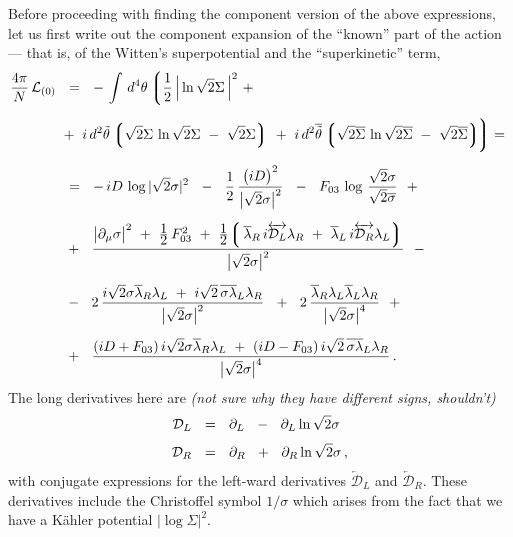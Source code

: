 \documentclass[epsfig,12pt]{article}
\newcommand{\cell}{{\mathcal L}}
\newcommand{\p}{\partial}
\newcommand{\ov}{\overline}
\newcommand{\md}{\mathcal{D}}
\newcommand{\lgr}{\left\lgroup}
\newcommand{\rgr}{\right\rgroup}
\begin{document}
	Before proceeding with finding the component version of the above expressions, let
	us first write out the component expansion of the ``known'' part of the action --- that is, 
	of the Witten's superpotential and the ``superkinetic'' term,
\begin{align}
%
\notag
	\frac{4\pi}{N}\, \cell_{(0)} &    ~~=~~
	-\, \int\, d^4\theta\, \bigg\lgroup \frac{1}{2}\, \Big| \ln \sqrt{2}\Sigma \, \Big|^2
			~+~ 
	\\[2mm]
%
\notag
	&
			~+~
			i\, d^2\tilde\theta 
			\lgr \sqrt{2}\Sigma\, \ln \sqrt{2}\Sigma  ~-~ \sqrt{2}\Sigma \rgr
			~+~
			i\, d^2\ov{\tilde\theta}
			\lgr \sqrt{2}\ov\Sigma\, \ln \sqrt{2}\ov\Sigma  ~-~ \sqrt{2}\ov\Sigma \rgr
			\!\!\bigg\rgroup
			=~ 
	\\[2mm]
%
\notag
	&     ~~=~~
	-\,iD\, \log |\sqrt{2}\sigma|^2  ~~-~~  \frac{1}{2}\, \frac{ \big(i D\big)^2 } { \big|\sqrt{2}\sigma\big|^2 }
	~~-~~ F_{03}\, \log\, \frac{\sqrt{2}\sigma}{\sqrt{2}\ov\sigma}
	~~+~~
	\\[2mm]
%
\label{L0}
	&
	~~+~~ \frac{
		\big|\p_\mu \sigma\big|^2  ~+~  \frac{\displaystyle 1}{\displaystyle 2}\,F_{03}^2  ~+~
		\frac{\displaystyle 1}{\displaystyle 2}\!
			    \lgr\, \ov\lambda{}_R\, i\overleftrightarrow{\md_L} \lambda_R  ~+~ 
				   \ov\lambda{}_L\, i\overleftrightarrow{\md_R} \lambda_L \rgr
		} { \big|\sqrt{2}\sigma\big|^2 }
	~~-~~
	\\[2mm]
%
\notag
	&
	~~-~~ 2\,\frac{
			i\sqrt{2}\sigma\ov\lambda{}_R\lambda_L  ~+~  
			i\sqrt{2}\,\ov{\sigma\lambda}{}_L\lambda_R
		} { \big|\sqrt{2}\sigma\big|^2 }
	~~+~~ 2\, \frac{
			\ov\lambda{}_R \lambda_L \ov\lambda{}_L \lambda_R
		} { \big|\sqrt{2}\sigma\big|^4 }
	~~+~~
	\\[2mm]
%
\notag
	&
	~~+~~
	\frac{	(iD + F_{03})\, i\sqrt{2}\sigma \ov\lambda{}_R\lambda_L ~+~
		(iD - F_{03})\, i\sqrt{2}\,\ov{\sigma \lambda}{}_L\lambda_R  }
		{ \big|\sqrt{2}\sigma\big|^4 }\,.
\end{align}
	The long derivatives here are {\it (not sure why they have different signs, shouldn't)}
\begin{align}
%
\notag
	\md_L &    ~~=~~    \p_L  ~~-~~  \p_L \ln \sqrt{2}\sigma
	\\[1mm]
%
	\md_R &    ~~=~~    \p_R  ~~+~~  \p_R \ln \sqrt{2}\sigma\,,
\end{align}
	with conjugate expressions for the left-ward derivatives 
	$ \overleftarrow{\md}{}_L $ and $ \overleftarrow{\md}{}_R $.
	These derivatives include the Christoffel symbol $ 1 / \sigma $ which arises from
	the fact that we have a  K\"ahler potential $ \big| \log \Sigma \big|^2 $.
\end{document}
